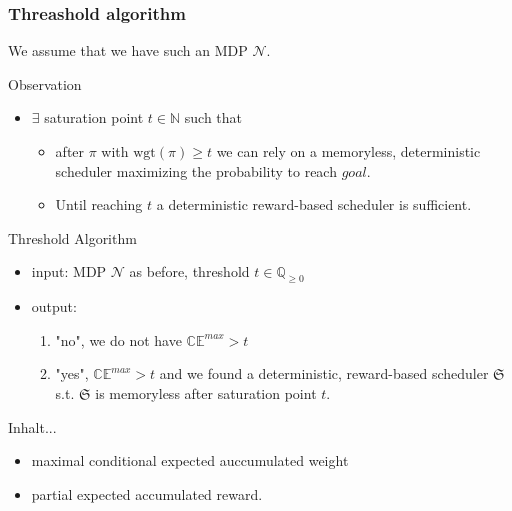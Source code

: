 \documentclass[onlymath]{beamer}
\begin{document}
\begin{frame}
	\frametitle{Threashold algorithm}
	We assume that we have such an MDP $\mathcal{N}$. \pause
	\begin{block}{Observation}
		\begin{itemize}
			\item $\exists$ saturation point $t \in \mathbb{N}$ such that \pause
			\begin{itemize}
				\item after $\pi$ with $\mathrm{wgt}(\pi) \geq t$ we can rely on a memoryless, deterministic scheduler maximizing the probability to reach $goal$. \pause
				\item Until reaching $t$ a deterministic reward-based scheduler is sufficient.
			\end{itemize}
		\end{itemize}
	\end{block}
\pause
	\begin{block}{Threshold Algorithm}
		\begin{itemize}
			\item input: MDP $\mathcal{N}$ as before, threshold $t \in \mathbb{Q}_{\geq 0}$\pause
			\item output:\begin{enumerate}
				\item "no", we do not have $\mathbb{CE}^{max}>t$
				\item "yes", $\mathbb{CE}^{max}>t$ and we found a deterministic, reward-based scheduler $\mathfrak{S}$ s.t. \pause $\mathfrak{S}$ is memoryless after saturation point $t$.
			\end{enumerate}
		\end{itemize}
	\end{block}
\end{frame}

\begin{frame}
	Inhalt...
\end{frame}

\begin{frame}
\begin{itemize}
	\item maximal conditional expected auccumulated weight
	\item partial expected accumulated reward.
\end{itemize}

\end{frame}
\end{document}
